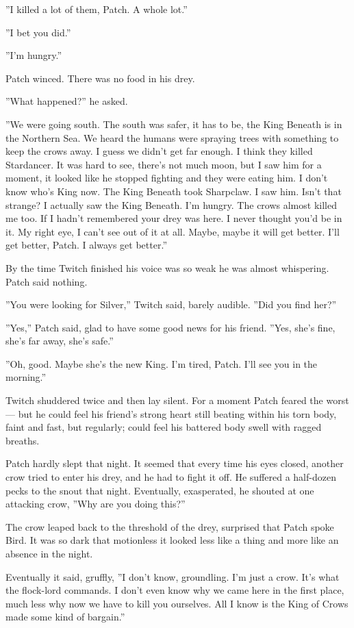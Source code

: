 \documentclass[12pt]{book}
\begin{document}
''I killed a lot of them, Patch. A whole lot.''

''I bet you did.''

''I'm hungry.''

Patch winced. There was no food in his drey.

''What happened?'' he asked.

''We were going south. The south was safer, it has to be, the King Beneath is in the Northern Sea. We heard the humans were spraying trees with something to keep the crows away. I guess we didn't get far enough. I think they killed Stardancer. It was hard to see, there's not much moon, but I saw him for a moment, it looked like he stopped fighting and they were eating him. I don't know who's King now. The King Beneath took Sharpclaw. I saw him. Isn't that strange? I actually saw the King Beneath. I'm hungry. The crows almost killed me too. If I hadn't remembered your drey was here. I never thought you'd be in it. My right eye, I can't see out of it at all. Maybe, maybe it will get better. I'll get better, Patch. I always get better.''

By the time Twitch finished his voice was so weak he was almost whispering. Patch said nothing.

''You were looking for Silver,'' Twitch said, barely audible. ''Did you find her?''

''Yes,'' Patch said, glad to have some good news for his friend. ''Yes, she's fine, she's far away, she's safe.''

''Oh, good. Maybe she's the new King. I'm tired, Patch. I'll see you in the morning.''

Twitch shuddered twice and then lay silent. For a moment Patch feared the worst ---
but he could feel his friend's strong heart still beating within his torn body, faint and fast, but regularly; could feel his battered body swell with ragged breaths.

Patch hardly slept that night. It seemed that every time his eyes closed, another crow tried to enter his drey, and he had to fight it off. He suffered a half-dozen pecks to the snout that night. Eventually, exasperated, he shouted at one attacking crow, ''Why are you doing this?''

The crow leaped back to the threshold of the drey, surprised that Patch spoke Bird. It was so dark that motionless it looked less like a thing and more like an absence in the night.

Eventually it said, gruffly, ''I don't know, groundling. I'm just a crow. It's what the flock-lord commands. I don't even know why we came here in the first place, much less why now we have to kill you ourselves. All I know is the King of Crows made some kind of bargain.''
\end{document}

